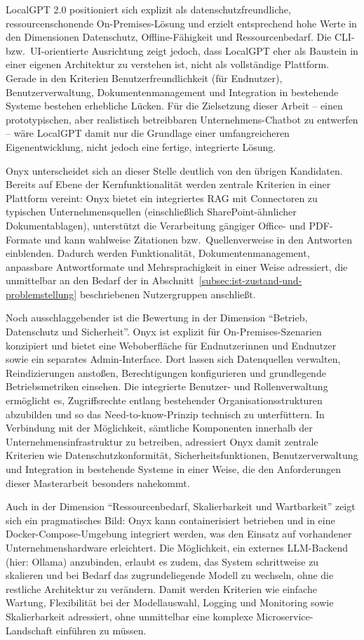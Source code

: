 LocalGPT 2.0 positioniert sich explizit als datenschutzfreundliche, ressourcenschonende On-Premises-Lösung und erzielt entsprechend hohe Werte in den Dimensionen Datenschutz, Offline-Fähigkeit und Ressourcenbedarf.
Die CLI- bzw.\ UI-orientierte Ausrichtung zeigt jedoch, dass LocalGPT eher als Baustein in einer eigenen Architektur zu verstehen ist, nicht als vollständige Plattform.
Gerade in den Kriterien Benutzerfreundlichkeit (für Endnutzer), Benutzerverwaltung, Dokumentenmanagement und Integration in bestehende Systeme bestehen erhebliche Lücken.
Für die Zielsetzung dieser Arbeit – einen prototypischen, aber realistisch betreibbaren Unternehmens-Chatbot zu entwerfen – wäre LocalGPT damit nur die Grundlage einer umfangreicheren Eigenentwicklung, nicht jedoch eine fertige, integrierte Lösung.

Onyx unterscheidet sich an dieser Stelle deutlich von den übrigen Kandidaten.
Bereits auf Ebene der Kernfunktionalität werden zentrale Kriterien in einer Plattform vereint:
Onyx bietet ein integriertes RAG mit Connectoren zu typischen Unternehmensquellen (einschließlich SharePoint-ähnlicher Dokumentablagen), unterstützt die Verarbeitung gängiger Office- und PDF-Formate und kann wahlweise Zitationen bzw.\ Quellenverweise in den Antworten einblenden.
Dadurch werden Funktionalität, Dokumentenmanagement, anpassbare Antwortformate und Mehrsprachigkeit in einer Weise adressiert, die unmittelbar an den Bedarf der in Abschnitt~\ref{subsec:ist-zustand-und-problemstellung} beschriebenen Nutzergruppen anschließt.

Noch ausschlaggebender ist die Bewertung in der Dimension \enquote{Betrieb, Datenschutz und Sicherheit}.
Onyx ist explizit für On-Premises-Szenarien konzipiert und bietet eine Weboberfläche für Endnutzerinnen und Endnutzer sowie ein separates Admin-Interface.
Dort lassen sich Datenquellen verwalten, Reindizierungen anstoßen, Berechtigungen konfigurieren und grundlegende Betriebsmetriken einsehen.
Die integrierte Benutzer- und Rollenverwaltung ermöglicht es, Zugriffsrechte entlang bestehender Organisationsstrukturen abzubilden und so das Need-to-know-Prinzip technisch zu unterfüttern.
In Verbindung mit der Möglichkeit, sämtliche Komponenten innerhalb der Unternehmensinfrastruktur zu betreiben, adressiert Onyx damit zentrale Kriterien wie Datenschutzkonformität, Sicherheitsfunktionen, Benutzerverwaltung und Integration in bestehende Systeme in einer Weise, die den Anforderungen dieser Masterarbeit besonders nahekommt.

Auch in der Dimension \enquote{Ressourcenbedarf, Skalierbarkeit und Wartbarkeit} zeigt sich ein pragmatisches Bild:
Onyx kann containerisiert betrieben und in eine Docker-Compose-Umgebung integriert werden, was den Einsatz auf vorhandener Unternehmenshardware erleichtert.
Die Möglichkeit, ein externes LLM-Backend (hier: Ollama) anzubinden, erlaubt es zudem, das System schrittweise zu skalieren und bei Bedarf das zugrundeliegende Modell zu wechseln, ohne die restliche Architektur zu verändern.
Damit werden Kriterien wie einfache Wartung, Flexibilität bei der Modellauswahl, Logging und Monitoring sowie Skalierbarkeit adressiert, ohne unmittelbar eine komplexe Microservice-Landschaft einführen zu müssen.

